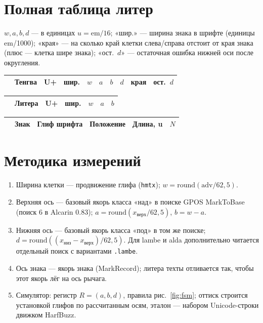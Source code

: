 \documentclass[11pt,a4paper]{article}
\newlength\tgem \setlength\tgem{5mm}
\newcommand\code[1]{\texttt{#1}}
\begin{document}
\section{Полная таблица литер}
\label{app:tables}

$w, a, b, d$ — в единицах $u = \mathrm{em}/16$; «шир.» — ширина знака в шрифте (единицы em/1000); «края» — на сколько край клетки слева/справа отстоит от края знака (плюс — клетка шире знака); «ост.~$d$» — остаточная ошибка нижней оси после округления.

{\small\setlength\tgem{5.5mm}
\begin{longtable}{@{}cllrrrrrcr@{}}
\toprule
& Тенгва & U+ & шир. & $w$ & $a$ & $b$ & $d$ & края & ост.~$d$ \\
\midrule\endhead

\bottomrule
\end{longtable}}

{\small\setlength\tgem{5.5mm}
\begin{longtable}{@{}cllrrrr@{}}
\toprule
& Литера & U+ & шир. & $w$ & $a$ & $b$ \\
\midrule\endhead

\bottomrule
\end{longtable}}

{\small\setlength\tgem{5.5mm}
\begin{longtable}{@{}cllcrc@{}}
\toprule
& Знак & Глиф шрифта & Положение & Длина, u & $N$ \\
\midrule\endhead

\bottomrule
\end{longtable}}

\section{Методика измерений}
\label{app:method}

\begin{enumerate}
  \item Ширина клетки — продвижение глифа (\code{hmtx}); $w = \mathrm{round}(\text{adv}/62{,}5)$.
  \item Верхняя ось — базовый якорь класса «над» в поиске GPOS MarkToBase (поиск 6 в Alcarin 0.83); $a = \mathrm{round}(x_{\text{верх}}/62{,}5)$, $b = w - a$.
  \item Нижняя ось — базовый якорь класса «под» в том же поиске; $d = \mathrm{round}((x_{\text{низ}} - x_{\text{верх}})/62{,}5)$. Для lambe и alda дополнительно читается отдельный поиск с вариантами \code{.lambe}.
  \item Ось знака — якорь знака (MarkRecord); литера техты отливается так, чтобы этот якорь лёг на ось рычага.
  \item Симулятор: регистр $R=(a,b,d)$, правила рис.~\ref{fig:fsm}; оттиск строится установкой глифов по рассчитанным осям, эталон — набором Unicode-строки движком HarfBuzz.
\end{enumerate}
\end{document}
